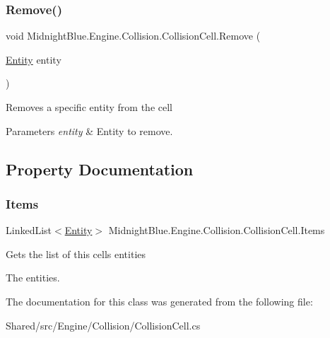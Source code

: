 \subsubsection{\texorpdfstring{Remove()}{Remove()}}
{\footnotesize\ttfamily void Midnight\+Blue.\+Engine.\+Collision.\+Collision\+Cell.\+Remove (\begin{DoxyParamCaption}\item[{\hyperlink{class_midnight_blue_1_1_engine_1_1_entity_component_1_1_entity}{Entity}}]{entity }\end{DoxyParamCaption})\hspace{0.3cm}{\ttfamily [inline]}}



Removes a specific entity from the cell 


\begin{DoxyParams}{Parameters}
{\em entity} & Entity to remove.\\
\hline
\end{DoxyParams}


\subsection{Property Documentation}
\hypertarget{class_midnight_blue_1_1_engine_1_1_collision_1_1_collision_cell_a09d161aa9960e0ab945d60500dabc523}{}\label{class_midnight_blue_1_1_engine_1_1_collision_1_1_collision_cell_a09d161aa9960e0ab945d60500dabc523} 
\subsubsection{\texorpdfstring{Items}{Items}}
{\footnotesize\ttfamily Linked\+List$<$\hyperlink{class_midnight_blue_1_1_engine_1_1_entity_component_1_1_entity}{Entity}$>$ Midnight\+Blue.\+Engine.\+Collision.\+Collision\+Cell.\+Items\hspace{0.3cm}{\ttfamily [get]}}



Gets the list of this cells entities 

The entities.

The documentation for this class was generated from the following file\+:\begin{DoxyCompactItemize}
\item 
Shared/src/\+Engine/\+Collision/Collision\+Cell.\+cs\end{DoxyCompactItemize}
